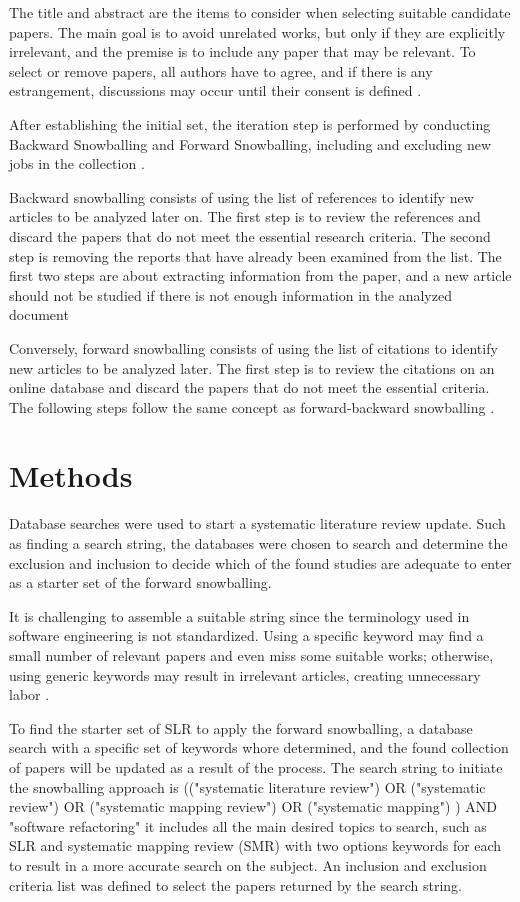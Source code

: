 The title and abstract are the items to consider when selecting suitable candidate papers. The main goal is to avoid unrelated works, but only if they are explicitly irrelevant, and the premise is to include any paper that may be relevant. To select or remove papers, all authors have to agree, and if there is any estrangement, discussions may occur until their consent is defined \textcite{Kitchenham2013}.

After establishing the initial set, the iteration step is performed by conducting Backward Snowballing and Forward Snowballing, including and excluding new jobs in the collection \cite{Wohlin2014}.

Backward snowballing consists of using the list of references to identify new articles to be analyzed later on. The first step is to review the references and discard the papers that do not meet the essential research criteria. The second step is removing the reports that have already been examined from the list. The first two steps are about extracting information from the paper, and a new article should not be studied if there is not enough information in the analyzed document \cite{Wohlin2014}

Conversely, forward snowballing consists of using the list of citations to identify new articles to be analyzed later. The first step is to review the citations on an online database and discard the papers that do not meet the essential criteria. The following steps follow the same concept as forward-backward snowballing \cite{Felizardo2016}.

\section{Methods}
\label{sec-methods}
Database searches were used to start a systematic literature review update. Such as finding a search string, the databases were chosen to search and determine the exclusion and inclusion to decide which of the found studies are adequate to enter as a starter set of the forward snowballing.

It is challenging to assemble a suitable string since the terminology used in software engineering is not standardized. Using a specific keyword may find a small number of relevant papers and even miss some suitable works; otherwise, using generic keywords may result in irrelevant articles, creating unnecessary labor \cite{Wohlin2014}.

To find the starter set of SLR to apply the forward snowballing, a database search with a specific set of keywords whore determined, and the found collection of papers will be updated as a result of the process. The search string to initiate the snowballing approach is (("systematic literature review") OR ("systematic review") OR ("systematic mapping review") OR ("systematic mapping") ) AND "software refactoring" it includes all the main desired topics to search, such as SLR and systematic mapping review (SMR) with two options keywords for each to result in a more accurate search on the subject. An inclusion and exclusion criteria list was defined to select the papers returned by the search string.

